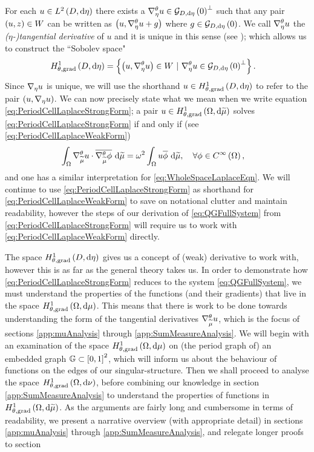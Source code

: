 For each $u\in L^{2}\left( D,\mathrm{d}\eta \right)$ there exists a $\nabla^{\theta}_\eta u\in\mathcal{G}_{ D, \mathrm{d}\eta}\left( 0 \right)^{\perp}$ such that any pair $\left( u,z \right)\in W$ can be written as $\left( u,\nabla^{\theta}_\eta u + g \right)$ where $g\in\mathcal{G}_{ D, \mathrm{d}\eta}\left( 0 \right)$.
We call $\nabla^{\theta}_\eta u$ the \emph{($\eta$-)tangential derivative} of $u$ and it is unique in this sense (see \cite[Section~9]{zhikov2000extension}); which allows us to construct the ``Sobolev space"
\begin{align*}
	\gradSobQM{D}{\eta} &= \clbracs{ \bracs{u, \tgrad_\eta u}\in W \ \vert \ \tgrad_\eta u \in \gradZero{D}{\eta}^{\perp} }.
\end{align*}
Since $\nabla_\eta u$ is unique, we will use the shorthand $u\in H^1_{\theta, \mathrm{grad}}\left( D, \mathrm{d}\eta \right)$ to refer to the pair $\left( u, \nabla_\eta u \right)$.
We can now precisely state what we mean when we write equation \eqref{eq:PeriodCellLaplaceStrongForm}; a pair $u\in H^1_{\theta, \mathrm{grad}}\left( \Omega, \mathrm{d}\widetilde{\mu} \right)$ solves \eqref{eq:PeriodCellLaplaceStrongForm} if and only if (see \eqref{eq:PeriodCellLaplaceWeakForm})
\begin{align*}
	\int_{\Omega}\nabla^{\theta}_{\widetilde{\mu}}u\cdot\overline{\nabla^{\theta}_{\widetilde{\mu}}\phi} \ \mathrm{d}\widetilde{\mu} &= \omega^2\int_{\Omega}u\overline{\phi} \ \mathrm{d}\widetilde{\mu}, \quad\forall \phi\in C^{\infty}\left( \Omega \right),
\end{align*}
and one has a similar interpretation for \eqref{eq:WholeSpaceLaplaceEqn}.
We will continue to use \eqref{eq:PeriodCellLaplaceStrongForm} as shorthand for \eqref{eq:PeriodCellLaplaceWeakForm} to save on notational clutter and maintain readability, however the steps of our derivation of \eqref{eq:QGFullSystem} from \eqref{eq:PeriodCellLaplaceStrongForm} will require us to work with \eqref{eq:PeriodCellLaplaceWeakForm} directly. \newline

The space $H^1_{\theta, \mathrm{grad}}\left( D, \mathrm{d}\eta \right)$ gives us a concept of (weak) derivative to work with, however this is as far as the general theory takes us.
In order to demonstrate how \eqref{eq:PeriodCellLaplaceStrongForm} reduces to the system \eqref{eq:QGFullSystem}, we must understand the properties of the functions (and their gradients) that live in the space $H^1_{\theta, \mathrm{grad}}\left( \Omega, \mathrm{d}\mu \right)$.
This means that there is work to be done towards understanding the form of the tangential derivatives $\nabla^{\theta}_{\widetilde{\mu}}u$, which is the focus of sections \ref{app:muAnalysis} through \ref{app:SumMeasureAnalysis}.
We will begin with an examination of the space $H^1_{\theta, \mathrm{grad}}\left( \Omega, \mathrm{d}\mu \right)$ on (the period graph of) an embedded graph $\mathbb{G}\subset\left[ 0,1 \right]^2$, which will inform us about the behaviour of functions on the edges of our singular-structure.
Then we shall proceed to analyse the space $H^1_{\theta, \mathrm{grad}}\left( \Omega, \mathrm{d}\nu \right)$, before combining our knowledge in section \ref{app:SumMeasureAnalysis} to understand the properties of functions in $H^1_{\theta, \mathrm{grad}}\left( \Omega, \mathrm{d}\widetilde{\mu} \right)$.
As the arguments are fairly long and cumbersome in terms of readability, we present a narrative overview (with appropriate detail) in sections \ref{app:muAnalysis} through \ref{app:SumMeasureAnalysis}, and relegate longer proofs to section 

